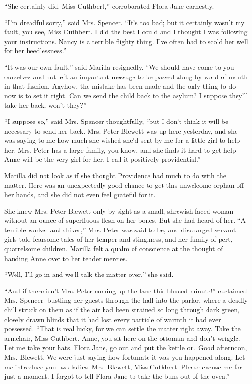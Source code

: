 \documentclass[a4paper]{article}
\begin{document}
{{{{{{{{\scriptsize{``She certainly did, Miss Cuthbert,'' corroborated Flora Jane earnestly.

\tiny{``I'm dreadful sorry,'' said Mrs. Spencer. ``It's too bad; but it certainly wasn't my fault, you see, Miss Cuthbert. I did the best I could and I thought I was following your instructions. Nancy is a terrible flighty thing. I've often had to scold her well for her heedlessness.''}

``It was our own fault,'' said Marilla resignedly. ``We should have come to you ourselves and not left an important message to be passed along by word of mouth in that fashion. Anyhow, the mistake has been made and the only thing to do now is to set it right. Can we send the child back to the asylum? I suppose they'll take her back, won't they?''}

``I suppose so,'' said Mrs. Spencer thoughtfully, ``but I don't think it will be necessary to send her back. Mrs. Peter Blewett was up here yesterday, and she was saying to me how much she wished she'd sent by me for a little girl to help her. Mrs. Peter has a large family, you know, and she finds it hard to get help. Anne will be the very girl for her. I call it positively providential.''}

Marilla did not look as if she thought Providence had much to do with the matter. Here was an unexpectedly good chance to get this unwelcome orphan off her hands, and she did not even feel grateful for it.}

She knew Mrs. Peter Blewett only by sight as a small, shrewish-faced woman without an ounce of superfluous flesh on her bones. But she had heard of her. ``A terrible worker and driver,'' Mrs. Peter was said to be; and discharged servant girls told fearsome tales of her temper and stinginess, and her family of pert, quarrelsome children. Marilla felt a qualm of conscience at the thought of handing Anne over to her tender mercies.}

``Well, I'll go in and we'll talk the matter over,'' she said.}

``And if there isn't Mrs. Peter coming up the lane this blessed minute!'' exclaimed Mrs. Spencer, bustling her guests through the hall into the parlor, where a deadly chill struck on them as if the air had been strained so long through dark green, closely drawn blinds that it had lost every particle of warmth it had ever possessed. ``That is real lucky, for we can settle the matter right away. Take the armchair, Miss Cuthbert. Anne, you sit here on the ottoman and don't wriggle. Let me take your hats. Flora Jane, go out and put the kettle on. Good afternoon, Mrs. Blewett. We were just saying how fortunate it was you happened along. Let me introduce you two ladies. Mrs. Blewett, Miss Cuthbert. Please excuse me for just a moment. I forgot to tell Flora Jane to take the buns out of the oven.''}

}}}
\end{document}

